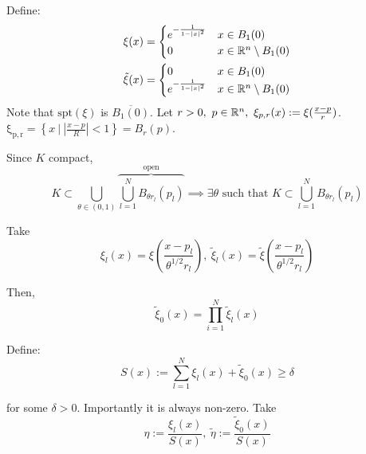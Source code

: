 \documentclass[12pt]{article}
\begin{document}

\begin{proofbox}
    Define:
    $$
    \begin{aligned}
        \xi(x) =    \begin{cases}
                        e^{-\frac{1}{1-|x|^2}} & x \in B_1(0) \\
                        0 & x \in \mathbb{R}^n \setminus B_1(0) \\
                    \end{cases} \\
        \tilde{\xi}(x) =    \begin{cases}
                        0 & x \in B_1(0) \\
                        e^{-\frac{1}{1-|x|^2}} & x \in \mathbb{R}^n \setminus B_1(0) \\
                    \end{cases}
    \end{aligned}
    $$
    Note that $\mathrm{spt}(\xi)$ is $\overline{B_1(0)}$. Let $r > 0,\ p \in \mathbb{R}^n,\ \xi_{p, r}(x) := \xi(\frac{x - p}{r})$. $\mathrm{\xi_{p, r}} = \left\{x\ \big|\ |\frac{x-p}{R}| < 1\right\} = B_r(p)$.

    Since $K$ compact, 
    $$
        K \subset \bigcup\limits_{\theta \in (0, 1)} \overbrace{\bigcup\limits_{l = 1}^N B_{\theta r_l}(p_l)}^{\text{open}} \implies \exists \theta \text{ such that } K \subset \bigcup\limits_{l = 1}^N B_{\theta r_l}(p_l)
    $$

    Take 
    $$
    \xi_l(x) = \xi(\frac{x - p_l}{\theta^{1/2}r_l}),\ \tilde{\xi}_l(x) = \tilde{\xi}(\frac{x - p_l}{\theta^{1/2}r_l})
    $$

    Then,
    $$
        \tilde{\xi}_0(x) = \prod_{i = 1}^{N} \tilde{\xi}_l(x)
    $$

    Define:
    $$
        S(x) := \sum_{l = 1}^{N} \xi_l(x) + \tilde{\xi}_0(x) \geq \delta
    $$

    for some $\delta > 0$. Importantly it is always non-zero. Take
    $$
        \eta := \frac{\xi_l(x)}{S(x)},\ \tilde\eta := \frac{\tilde\xi_0(x)}{S(x)}
    $$
\end{proofbox}
\end{document}
